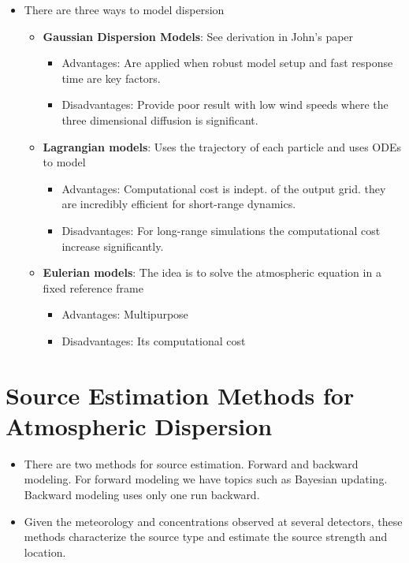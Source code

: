 \documentclass[12pt]{article}
\begin{document}
\begin{itemize}
\item There are three ways to model dispersion
	\begin{itemize}
	\item \textbf{Gaussian Dispersion Models}: See derivation in John's paper
		\begin{itemize}
		\item Advantages: Are applied when robust model setup and fast
		response time are key factors.
		\item Disadvantages: Provide poor result with low wind speeds
		where the three dimensional diffusion is significant.
		\end{itemize}
	\item \textbf{Lagrangian models}: Uses the trajectory of each particle and uses ODEs to model
		\begin{itemize}
		\item Advantages: Computational cost is indept. of the output grid. they
		are incredibly efficient for short-range dynamics.

		\item Disadvantages: For long-range simulations the computational cost increase
		significantly.
		\end{itemize}
	\item \textbf{Eulerian models}: The idea is to solve the atmospheric equation in a fixed reference frame
		\begin{itemize}
		\item Advantages: Multipurpose
		\item Disadvantages: Its computational cost
		\end{itemize}
	\end{itemize}
\end{itemize}
\newpage
\section*{Source Estimation Methods for Atmospheric Dispersion}

\begin{itemize}
\item There are two methods for source estimation. Forward and backward modeling. 
For forward modeling we have topics such as Bayesian updating. Backward modeling
uses only one run backward.

\item Given the meteorology and concentrations observed at several detectors,
these methods characterize the source type and estimate the source strength and location.

\end{itemize}
\end{document}
